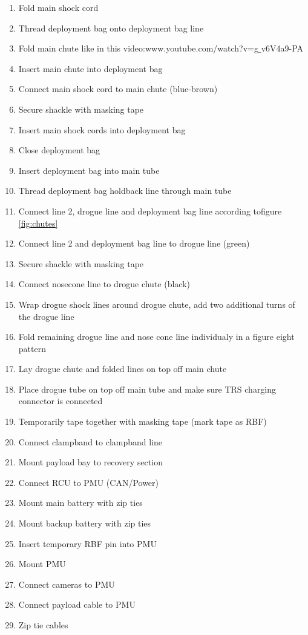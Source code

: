 \begin{enumerate}[label=R\arabic*.]
    \item Fold main shock cord\checkbox
    \item Thread deployment bag onto deployment bag line\checkbox
    \item Fold main chute like in this video:\newline www.youtube.com/watch?v=g$\_$v6V4a9-PA\checkbox
    \item Insert main chute into deployment bag\checkbox
    \item Connect main shock cord to main chute (blue-brown)\checkbox
    \item Secure shackle with masking tape \checkbox
    \item Insert main shock cords into deployment bag\checkbox
    \item Close deployment bag\checkbox
    \item Insert deployment bag into main tube\checkbox
    \item Thread deployment bag holdback line through main tube\checkbox
    \item Connect line 2, drogue line and deployment bag line according to\newline figure \ref{fig:chutes} \checkbox
    \item Connect line 2 and deployment bag line to drogue line (green) \checkbox
    \item Secure shackle with masking tape \checkbox
    \item Connect nosecone line to drogue chute (black) \checkbox
    \item Wrap drogue shock lines around drogue chute, add two additional turns of the drogue line\checkbox
    \item Fold remaining drogue line and nose cone line individualy in a figure eight pattern \checkbox
    \item Lay drogue chute and folded lines on top off main chute\checkbox
    \item Place drogue tube on top off main tube and make sure TRS charging connector is connected\checkbox
    \item Temporarily tape together with masking tape (mark tape as RBF)\checkbox
    \item Connect clampband to clampband line \checkbox
    \item Mount payload bay to recovery section \checkbox
    \item Connect RCU to PMU (CAN/Power) \checkbox
    \item Mount main battery with zip ties \checkbox
    \item Mount backup battery with zip ties \checkbox
    \item Insert temporary RBF pin into PMU\checkbox
    \item Mount PMU \checkbox
    \item Connect cameras to PMU \checkbox
    \item Connect payload cable to PMU \checkbox
    \item Zip tie cables \checkbox


\end{enumerate}
